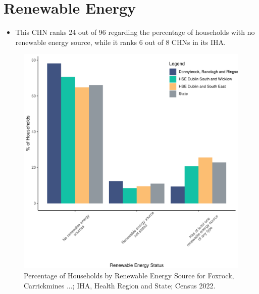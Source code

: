 \documentclass{article}
\begin{document}
\section{Renewable Energy}\label{sect:RE}
\begin{itemize}
\item This CHN ranks  24 out of 96 regarding the percentage of households with no renewable energy source, while it ranks   6 out of 8 CHNs in its IHA.
\end{itemize}
\begin{figure}[H]
	\centering
	\includegraphics[width = 140mm]{../figures/RenewableEnergyED.pdf}
	\caption{Percentage of Households by Renewable Energy Source for Foxrock, Carrickmines ...; IHA, Health Region and State; Census 2022.}
	\label{fig:vbnv}
	\end{figure}
\end{document}
